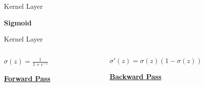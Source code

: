 
\begin{slide}{Kernel Layer}

  \textbf{Sigmoid}
\end{slide}

\begin{slide}{Kernel Layer}
\begin{columns}
  \begin{column}{0.5\textwidth}
    \centering
    $\sigma(z) = \frac{1}{1 + e^{-z}}$

    \vspace{0.5cm}
    \href{https://eigen.tuxfamily.org/dox/unsupported/TensorFunctors_8h_source.html}{\textbf{Forward Pass}}
  \end{column}
  \begin{column}{0.5\textwidth}
    $\sigma'(z) = \sigma(z)(1 - \sigma(z))$

    \vspace{0.5cm}
    \hspace{0.4cm}\href{https://github.com/tensorflow/tensorflow/blob/2c8d0dca978a246f54c506aae4587dbce5d3bcf0/tensorflow/core/kernels/cwise_ops_gradients.h\#L51}{\textbf{Backward Pass}}
  \end{column}
\end{columns}
\end{slide}

